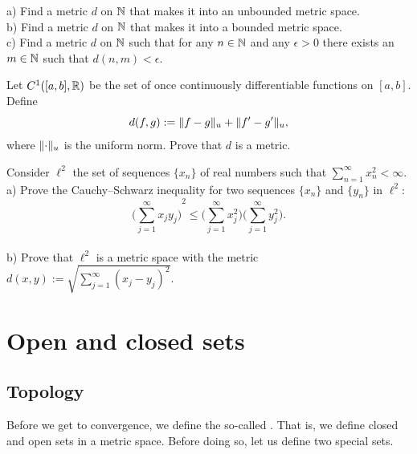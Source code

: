 \begin{exercise}
a) Find a metric $d$ on ${\mathbb{N}}$ that makes it into an unbounded metric space.
\\
b) Find a metric $d$ on ${\mathbb{N}}$ that makes it into a bounded metric space.
\\
c) Find a metric $d$ on ${\mathbb{N}}$ such that for any $n \in {\mathbb{N}}$ and any $\epsilon > 0$
there exists an $m \in {\mathbb{N}}$ such that $d(n,m) < \epsilon$.
\end{exercise}

\begin{exercise} \label{exercise:C1ab}
Let $C^1([a,b],{\mathbb{R}})$ be the set of once continuously differentiable
functions on $[a,b]$.
Define
\begin{equation*}
d(f,g) := \lVert {f-g} \rVert_u + \lVert {f'-g'} \rVert_u,
\end{equation*}
where $\lVert {\cdot} \rVert_u$ is the uniform norm.  Prove that $d$ is a metric.
\end{exercise}

\begin{exercise}
Consider $\ell^2$ the set of sequences $\{ x_n \}$
of real numbers
such that $\sum_{n=1}^\infty x_n^2 < \infty$.
\\
a) Prove the Cauchy--Schwarz inequality for two sequences
$\{x_n \}$ and $\{ y_n \}$ in $\ell^2$:
\begin{equation*}
{\biggl( \sum_{j=1}^\infty x_j y_j \biggr)}^2
\leq
\biggl(\sum_{j=1}^\infty x_j^2 \biggr)
\biggl(\sum_{j=1}^\infty y_j^2 \biggr) .
\end{equation*}
\\
b) Prove that $\ell^2$ is a metric space with the metric
$d(x,y) := \sqrt{\sum_{j=1}^\infty {(x_j-y_j)}^2}$.
\end{exercise}


\sectionnewpage
\section{Open and closed sets}
\label{sec:mettop}


\subsection{Topology}

Before we get to convergence,
we define the so-called \emph{}.
That is,
we define closed and open sets in a metric space.
Before doing so,
let us define two special sets.

